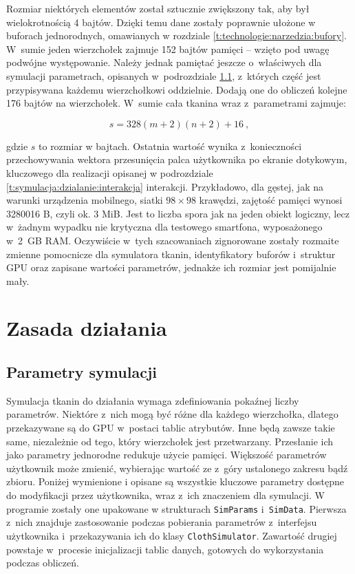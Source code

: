 	Rozmiar niektórych elementów został sztucznie zwiększony tak, aby był wielokrotnością 4 bajtów. Dzięki temu dane zostały poprawnie ułożone w buforach jednorodnych, omawianych w rozdziale \ref{t:technologie:narzedzia:bufory}. W~sumie jeden wierzchołek zajmuje 152 bajtów pamięci -- wzięto pod uwagę podwójne występowanie. Należy jednak pamiętać jeszcze o~właściwych dla symulacji parametrach, opisanych w~podrozdziale \ref{t:symulacja:dzialanie:parametry}, z~których część jest przypisywana każdemu wierzchołkowi oddzielnie. Dodają one do obliczeń kolejne 176 bajtów na wierzchołek. W~sumie cała tkanina wraz z~parametrami zajmuje:
	
	\begin{equation}
	s = 328(m + 2)(n + 2) + 16 \ ,
	\end{equation} 
	
	gdzie \(s\) to rozmiar w bajtach. Ostatnia wartość wynika z~konieczności przechowywania wektora przesunięcia palca użytkownika po ekranie dotykowym, kluczowego dla realizacji opisanej w podrozdziale \ref{t:symulacja:dzialanie:interakcja} interakcji. Przykładowo, dla gęstej, jak na warunki urządzenia mobilnego, siatki \( 98 \times 98 \) krawędzi, zajętość pamięci wynosi 3280016 B, czyli ok. 3 MiB. Jest to liczba spora jak na jeden obiekt logiczny, lecz w~żadnym wypadku nie krytyczna dla testowego smartfona, wyposażonego w~2~GB RAM. Oczywiście w~tych szacowaniach zignorowane zostały rozmaite zmienne pomocnicze dla symulatora tkanin, identyfikatory buforów i~struktur GPU oraz zapisane wartości parametrów, jednakże ich rozmiar jest pomijalnie mały.
	
	\section{Zasada działania}
	\label{t:symulacja:dzialanie}
	
			
			\subsection{Parametry symulacji}
			\label{t:symulacja:dzialanie:parametry}
			
			
			Symulacja tkanin do działania wymaga zdefiniowania pokaźnej liczby parametrów. Niektóre z~nich mogą być różne dla każdego wierzchołka, dlatego przekazywane są do GPU w~postaci tablic atrybutów. Inne będą zawsze takie same, niezależnie od tego, który wierzchołek jest przetwarzany. Przesłanie ich jako parametry jednorodne redukuje użycie pamięci. Większość parametrów użytkownik może zmienić, wybierając wartość ze z~góry ustalonego zakresu bądź zbioru. Poniżej wymienione i opisane są wszystkie kluczowe parametry dostępne do modyfikacji przez użytkownika, wraz z~ich znaczeniem dla symulacji. W programie zostały one upakowane w strukturach \texttt{SimParams} i~\texttt{SimData}. Pierwsza z~nich znajduje zastosowanie podczas pobierania parametrów z~interfejsu użytkownika i~przekazywania ich do klasy \texttt{ClothSimulator}. Zawartość drugiej powstaje w~procesie inicjalizacji tablic danych, gotowych do wykorzystania podczas obliczeń.
			

